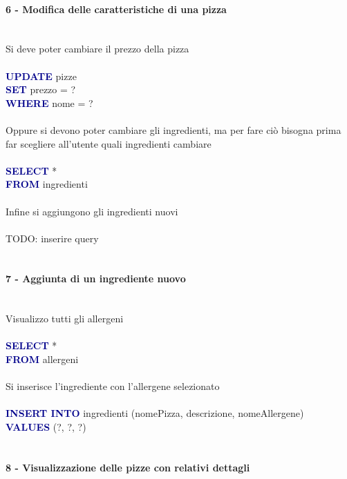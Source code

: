 \documentclass[a4paper,12pt, oneside]{article}
\begin{document}
\paragraph{6 - Modifica delle caratteristiche di una pizza}
\hphantom{A}\\    %
Si deve poter cambiare il prezzo della pizza
\\\\
\textcolor{darkBlue}{\textbf{UPDATE}} pizze
\\\textcolor{darkBlue}{\textbf{SET}} prezzo = ?
\\\textcolor{darkBlue}{\textbf{WHERE}} nome = ?
\\\\
Oppure si devono poter cambiare gli ingredienti, ma per fare ciò bisogna prima far scegliere all'utente quali ingredienti cambiare
\\\\
\textcolor{darkBlue}{\textbf{SELECT}} *
\\\textcolor{darkBlue}{\textbf{FROM}} ingredienti
\\\\
Infine si aggiungono gli ingredienti nuovi
\\\\
TODO: inserire query
\\\\

\paragraph{7 - Aggiunta di un ingrediente nuovo}
\hphantom{A}\\    %
Visualizzo tutti gli allergeni
\\\\
\textcolor{darkBlue}{\textbf{SELECT}} *
\\\textcolor{darkBlue}{\textbf{FROM}} allergeni
\\\\
Si inserisce l'ingrediente con l'allergene selezionato
\\\\
\textcolor{darkBlue}{\textbf{INSERT INTO}} ingredienti (nomePizza, descrizione, nomeAllergene)
\\\textcolor{darkBlue}{\textbf{VALUES}} (?, ?, ?)
\\\\

\paragraph{8 - Visualizzazione delle pizze con relativi dettagli}
\hphantom{A}\\    %
\end{document}
